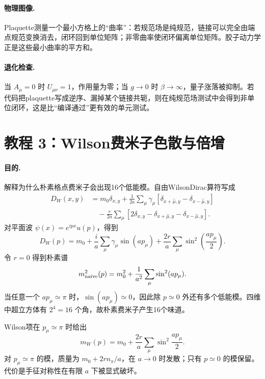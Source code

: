 \documentclass[UTF8,12pt,a4paper,twoside,openany]{ctexbook}
\begin{document}
\paragraph{物理图像.} Plaquette测量一个最小方格上的“曲率”：若规范场是纯规范，链接可以完全由端点规范变换消去，闭环回到单位矩阵；非零曲率使闭环偏离单位矩阵。胶子动力学正是这些最小曲率的平方和。

\paragraph{退化检查.} 当 \(A_\mu=0\) 时 \(U_{\mu\nu}=1\)，作用量为零；当 \(g\to0\) 时 \(\beta\to\infty\)，量子涨落被抑制。若代码把plaquette写成逆序、漏掉某个链接共轭，则在纯规范场测试中会得到非单位闭环，这是比“编译通过”更有效的单元测试。

\section{教程 3：Wilson费米子色散与倍增}

\paragraph{目的.} 解释为什么朴素格点费米子会出现16个低能模。自由WilsonDirac算符写成
\begin{align}
  D_W(x,y)
  &=m_0\delta_{x,y}
  +\frac{1}{2a}\sum_\mu\gamma_\mu
  \left[\delta_{x+\hat\mu,y}-\delta_{x-\hat\mu,y}\right]\nonumber\\
  &\quad-\frac{r}{2a}\sum_\mu
  \left[2\delta_{x,y}
  -\delta_{x+\hat\mu,y}-\delta_{x-\hat\mu,y}\right].
  \label{eq:tutorial-wilson-dirac}
\end{align}
对平面波 \(\psi(x)=e^{ipx}u(p)\)，得到
\begin{equation}
  D_W(p)
  =m_0+\frac{i}{a}\sum_\mu\gamma_\mu\sin(ap_\mu)
  +\frac{2r}{a}\sum_\mu\sin^2\left(\frac{ap_\mu}{2}\right).
  \label{eq:tutorial-wilson-symbol}
\end{equation}
令 \(r=0\) 得到朴素谱
\begin{equation}
  m_{\rm naive}^2(p)
  =m_0^2+\frac1{a^2}\sum_\mu\sin^2(ap_\mu).
  \label{eq:tutorial-naive-spectrum}
\end{equation}
当任意一个 \(ap_\mu\simeq\pi\) 时，\(\sin(ap_\mu)\simeq0\)，因此除 \(p\simeq0\) 外还有多个低能模。四维中超立方体有 \(2^4=16\) 个角，故朴素费米子产生16个味道。

Wilson项在 \(p_\mu\simeq\pi\) 时给出
\begin{equation}
  m_W(p)=m_0+\frac{2r}{a}\sum_\mu\sin^2\frac{ap_\mu}{2}.
  \label{eq:tutorial-wilson-mass}
\end{equation}
对 \(p_\mu\simeq\pi\) 的模，质量为 \(m_0+2rn_\pi/a\)，在 \(a\to0\) 时发散；只有 \(p\simeq0\) 的模保留。代价是手征对称性在有限 \(a\) 下被显式破坏。
\end{document}

